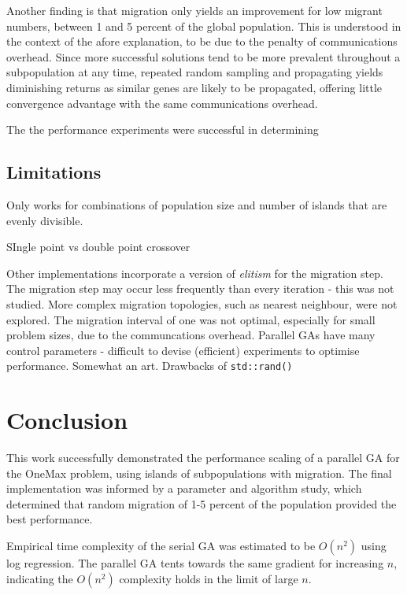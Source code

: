 \documentclass{report}
\begin{document}
Another finding is that migration only yields an improvement for low migrant numbers, between 1 and 5 percent of the global population. This is understood in the context of the afore explanation, to be due to the penalty of communications overhead. Since more successful solutions tend to be more prevalent throughout a subpopulation at any time, repeated random sampling and propagating yields diminishing returns as similar genes are likely to be propagated, offering little convergence advantage with the same communications overhead. 

The the performance experiments were successful in determining 

\subsection{Limitations}
Only works for combinations of population size and number of islands that are evenly divisible. 

SIngle point vs double point crossover

Other implementations incorporate a version of \emph{elitism} for the migration step.\cite{muhlenbein1991parallel}
The migration step may occur less frequently than every iteration - this was not studied.
More complex migration topologies, such as nearest neighbour, were not explored.
The migration interval of one was not optimal, especially for small problem sizes, due to the communcations overhead.
Parallel GAs have many control parameters - difficult to devise (efficient) experiments to optimise performance. Somewhat an art.
Drawbacks of  \texttt{std::rand()}
\newpage

\section{Conclusion}
This work successfully demonstrated the performance scaling of a parallel GA for the OneMax problem, using  islands of subpopulations with migration. The final implementation was informed by a parameter and algorithm study, which determined that random migration of 1-5 percent of the population provided the best performance. 

Empirical time complexity of the serial GA was estimated to be \(O(n^2)\) using log regression.  The parallel GA tents towards the same gradient for increasing \(n\), indicating the \(O(n^2)\) complexity holds in the limit of large \(n\). 
 


\end{document}
